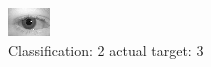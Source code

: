 \begin{figure}[h!]
\begin{center}
\includegraphics[width=0.60\columnwidth]{figures/ID568_class_2_target_3.png}
\end{center}
\caption{ Classification: 2 actual target: 3}
\label{fig:ID568_class_2_target_3}
\end{figure}
